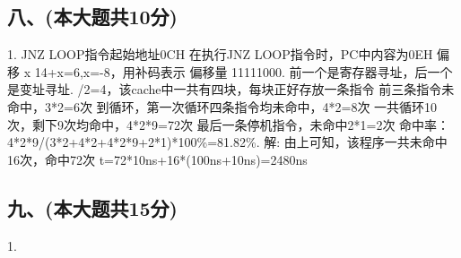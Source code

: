 \subsection{八、(本大题共10分)} 
1. \newline
JNZ LOOP指令起始地址0CH\newline
在执行JNZ LOOP指令时，PC中内容为0EH\newline
偏移 x 14+x=6,x=-8，用补码表示\newline
偏移量 11111000. \newline
前一个是寄存器寻址，后一个是变址寻址. /2=4，该cache中一共有四块，每块正好存放一条指令\newline
前三条指令未命中，3*2=6次\newline
到循环，第一次循环四条指令均未命中，4*2=8次\newline
一共循环10次，剩下9次均命中，4*2*9=72次\newline
最后一条停机指令，未命中2*1=2次\newline
命中率：4*2*9/(3*2+4*2+4*2*9+2*1)*100\%=81.82\%. \newline
解:\newline
由上可知，该程序一共未命中16次，命中72次\newline
t=72*10ns+16*(100ns+10ns)=2480ns
\subsection{九、(本大题共15分)}
1. \newline

